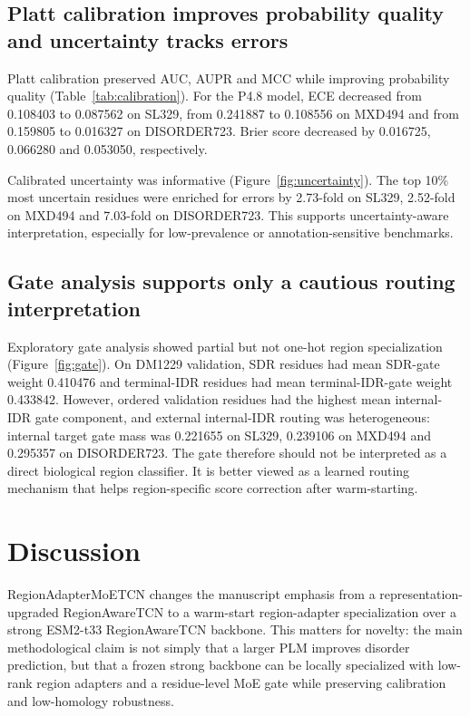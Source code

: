 \documentclass[namedate,webpdf,traditional,large]{oup-authoring-template}
\newcommand{\method}{RegionAdapterMoETCN}
\newcommand{\backbone}{RegionAwareTCN}
\begin{document}
\subsection{Platt calibration improves probability quality and uncertainty tracks errors}

Platt calibration preserved AUC, AUPR and MCC while improving probability quality (Table~\ref{tab:calibration}). For the P4.8 model, ECE decreased from 0.108403 to 0.087562 on SL329, from 0.241887 to 0.108556 on MXD494 and from 0.159805 to 0.016327 on DISORDER723. Brier score decreased by 0.016725, 0.066280 and 0.053050, respectively.

Calibrated uncertainty was informative (Figure~\ref{fig:uncertainty}). The top 10\% most uncertain residues were enriched for errors by 2.73-fold on SL329, 2.52-fold on MXD494 and 7.03-fold on DISORDER723. This supports uncertainty-aware interpretation, especially for low-prevalence or annotation-sensitive benchmarks.

\subsection{Gate analysis supports only a cautious routing interpretation}

Exploratory gate analysis showed partial but not one-hot region specialization (Figure~\ref{fig:gate}). On DM1229 validation, SDR residues had mean SDR-gate weight 0.410476 and terminal-IDR residues had mean terminal-IDR-gate weight 0.433842. However, ordered validation residues had the highest mean internal-IDR gate component, and external internal-IDR routing was heterogeneous: internal target gate mass was 0.221655 on SL329, 0.239106 on MXD494 and 0.295357 on DISORDER723. The gate therefore should not be interpreted as a direct biological region classifier. It is better viewed as a learned routing mechanism that helps region-specific score correction after warm-starting.

\section{Discussion}

\method{} changes the manuscript emphasis from a representation-upgraded \backbone{} to a warm-start region-adapter specialization over a strong ESM2-t33 \backbone{} backbone. This matters for novelty: the main methodological claim is not simply that a larger PLM improves disorder prediction, but that a frozen strong backbone can be locally specialized with low-rank region adapters and a residue-level MoE gate while preserving calibration and low-homology robustness.
\end{document}
